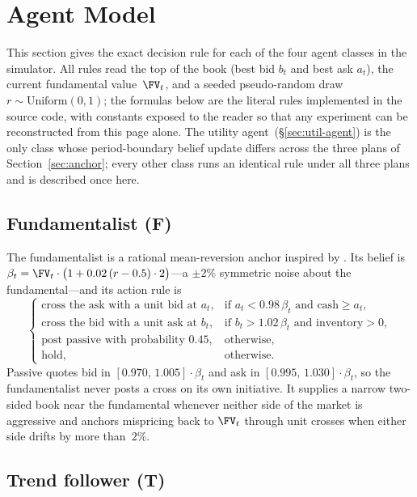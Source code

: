 \section{Agent Model}
\label{sec:agents}

This section gives the exact decision rule for each of the four
agent classes in the simulator. All rules read the top of the book
(best bid $b_t$ and best ask $a_t$), the current fundamental
value~$\FV_t$, and a seeded pseudo-random draw $r\sim
\text{Uniform}(0,1)$; the formulas below are the literal rules
implemented in the source code, with constants exposed to the
reader so that any experiment can be reconstructed from this page
alone. The utility agent~(\S\ref{sec:util-agent}) is the only class
whose period-boundary belief update differs across the three plans
of Section~\ref{sec:anchor}; every other class runs an identical
rule under all three plans and is described once here.

\subsection{Fundamentalist (F)}

The fundamentalist is a rational mean-reversion anchor inspired by
\citet{smith1988bubbles}. Its belief is
$\beta_t=\FV_t\cdot\bigl(1+0.02\,(r-0.5)\cdot 2\bigr)$---a
$\pm2\%$ symmetric noise about the fundamental---and its action
rule is
\begin{equation}
\label{eq:fund}
\begin{cases}
\text{cross the ask with a unit bid at }a_t, & \text{if }a_t<0.98\,\beta_t\text{ and cash}\ge a_t,\\
\text{cross the bid with a unit ask at }b_t, & \text{if }b_t>1.02\,\beta_t\text{ and inventory}>0,\\
\text{post passive with probability }0.45, & \text{otherwise,}\\
\text{hold}, & \text{otherwise.}
\end{cases}
\end{equation}
Passive quotes bid in $[0.970,\,1.005]\cdot\beta_t$ and ask in
$[0.995,\,1.030]\cdot\beta_t$, so the fundamentalist never posts a
cross on its own initiative. It supplies a narrow two-sided book
near the fundamental whenever neither side of the market is
aggressive and anchors mispricing back to $\FV_t$ through unit
crosses when either side drifts by more than~$2\%$.

\subsection{Trend follower (T)}

